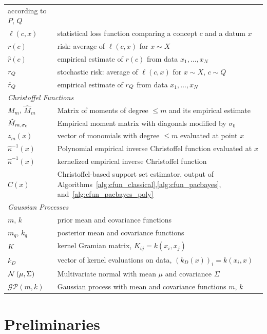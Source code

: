 \documentclass[onefignum,onetabnum]{siamart171218}
\begin{document}
\begin{tabular}{p{}p{}}
according to $P$, $Q$\\
$\ell(c,x)$ & statistical loss function comparing a concept $c$ and a
datum $x$\\
$r(c)$ & risk: average of $\ell(c,x)$ for $x\sim X$\\
$\hat{r}(c)$ & empirical estimate of $r(c)$ from data $x_1,\dotsc,x_N$\\
$r_{Q}$ & stochastic risk: average of $\ell(c,x)$ for $x\sim X$, $c\sim Q$\\
$\hat{r}_{Q}$ & empirical estimate of $r_{Q}$ from data $x_1,\dotsc,x_N$\\
%
%
\midrule
\multicolumn{2}{l}{
\emph{Christoffel Functions}
} \\
$M_m$, $\hat{M}_m$ & Matrix of moments of degree $\le m$ and its empirical
estimate\\
$\hat{M}_{m,\sigma_0}$ & Empirical moment matrix with diagonals modified by $\sigma_0$\\ 
$z_m(x)$ & vector of monomials with degree $\le m$ evaluated at point $x$\\
$\hat{\kappa}^{-1}(x)$ &  Polynomial empirical inverse Christoffel function
evaluated at $x$\\
$\hat{\kappa}^{-1}(x)$ &  kernelized empirical inverse Christoffel function\\
$C(x)$ & Christoffel-based support set estimator, output of
Algorithms~\ref{alg:cfun_classical},\ref{alg:cfun_pacbayes},
and~\ref{alg:cfun_pacbayes_poly}\\
%
%
\midrule
\multicolumn{2}{l}{
\emph{Gaussian Processes}
} \\
$m$, $k$ & prior mean and covariance functions\\
$m_q$, $k_q$ & posterior mean and covariance functions\\
$K$ & kernel Gramian matrix, $K_{ij}=k(x_i,x_j)$\\
$k_D$ & vector of kernel evaluations on data, $(k_D(x))_i=k(x_i,x)$\\
$\mathcal{N}\left(\mu,\Sigma\right)$ & Multivariate normal with mean $\mu$ and covariance
$\Sigma$\\
$\mathcal{GP}(m,k)$ & Gaussian process with mean and covariance functions $m$, $k$\\
\bottomrule
\end{tabular}


\section{Preliminaries}%
\label{sec:preliminaries}
\end{document}
